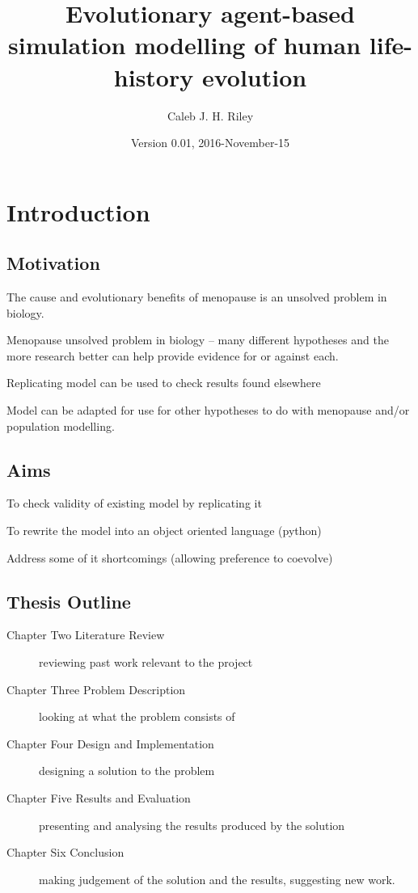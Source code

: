\documentclass[authoryearcitations]{UoYCSproject}
\author{Caleb J. H. Riley}
\title{Evolutionary agent-based simulation modelling of human life-history evolution}
\date{Version 0.01, 2016-November-15}
\begin{document}
\maketitle
\listoffigures
\listoftables

\cleardoublepage

\chapter{Introduction}
\label{cha:Introduction}
\section{Motivation}
The cause and evolutionary benefits of menopause is an unsolved problem in biology. 

Menopause unsolved problem in biology -- many different hypotheses and the more research better can help provide evidence for or against each.

Replicating model can be used to check results found elsewhere

Model can be adapted for use for other hypotheses to do with menopause and/or population modelling.

\section{Aims}
To check validity of existing model by replicating it

To rewrite the model into an object oriented language (python)

Address some of it shortcomings (allowing preference to coevolve)

\section{Thesis Outline}
\begin{description}

\item[Chapter Two Literature Review] reviewing past work relevant to the project

\item[Chapter Three Problem Description] looking at what the problem consists of

\item[Chapter Four Design and Implementation] designing a solution to the problem

\item[Chapter Five Results and Evaluation] presenting and analysing the results produced by the solution

\item[Chapter Six Conclusion] making judgement of the solution and the results, suggesting new work.

\end{description}
\end{document}
